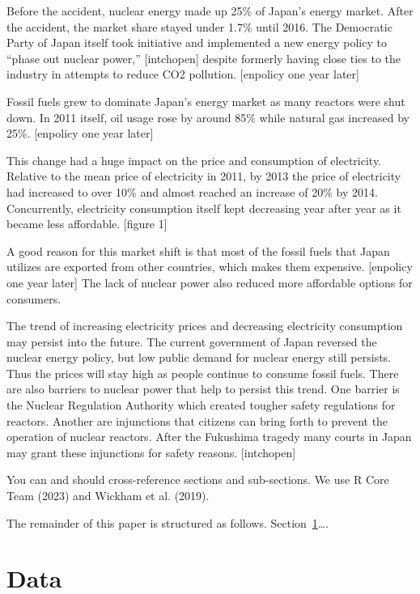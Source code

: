 \documentclass[
]{article}
\begin{document}
Before the accident, nuclear energy made up 25\% of Japan's energy
market. After the accident, the market share stayed under 1.7\% until
2016. The Democratic Party of Japan itself took initiative and
implemented a new energy policy to ``phase out nuclear power,''
{[}intchopen{]} despite formerly having close ties to the industry in
attempts to reduce CO2 pollution. {[}enpolicy one year later{]}

Fossil fuels grew to dominate Japan's energy market as many reactors
were shut down. In 2011 itself, oil usage rose by around 85\% while
natural gas increased by 25\%. {[}enpolicy one year later{]}

This change had a huge impact on the price and consumption of
electricity. Relative to the mean price of electricity in 2011, by 2013
the price of electricity had increased to over 10\% and almost reached
an increase of 20\% by 2014. Concurrently, electricity consumption
itself kept decreasing year after year as it became less affordable.
{[}figure 1{]}

A good reason for this market shift is that most of the fossil fuels
that Japan utilizes are exported from other countries, which makes them
expensive. {[}enpolicy one year later{]} The lack of nuclear power also
reduced more affordable options for consumers.

The trend of increasing electricity prices and decreasing electricity
consumption may persist into the future. The current government of Japan
reversed the nuclear energy policy, but low public demand for nuclear
energy still persists. Thus the prices will stay high as people continue
to consume fossil fuels. There are also barriers to nuclear power that
help to persist this trend. One barrier is the Nuclear Regulation
Authority which created tougher safety regulations for reactors. Another
are injunctions that citizens can bring forth to prevent the operation
of nuclear reactors. After the Fukushima tragedy many courts in Japan
may grant these injunctions for safety reasons. {[}intchopen{]}

You can and should cross-reference sections and sub-sections. We use R
Core Team (2023) and Wickham et al. (2019).

The remainder of this paper is structured as follows.
Section~\ref{sec-data}\ldots.

\hypertarget{sec-data}{%
\section{Data}\label{sec-data}}
\end{document}
